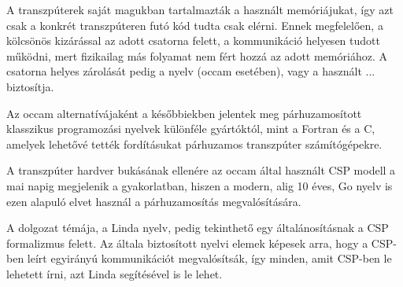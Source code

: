 A transzpúterek saját magukban tartalmazták a használt memóriájukat, így azt csak a konkrét transzpúteren futó kód tudta csak elérni.
Ennek megfelelően, a kölcsönös kizárással az adott csatorna felett, a kommunikáció helyesen tudott működni, mert fizikailag más folyamat nem fért hozzá az adott memóriához.
A csatorna helyes zárolását pedig a nyelv (occam esetében), vagy a használt ... biztosítja.

Az occam alternatívájaként a későbbiekben jelentek meg párhuzamosított klasszikus programozási nyelvek különféle gyártóktól, mint a Fortran és a C, amelyek lehetővé tették fordításukat párhuzamos transzpúter számítógépekre.

A transzpúter hardver bukásának ellenére az occam által használt CSP modell a mai napig megjelenik a gyakorlatban, hiszen a modern, alig 10 éves, Go nyelv is ezen alapuló elvet használ a párhuzamosítás megvalósítására. \cite{google_frequently_nodate}

A dolgozat témája, a Linda nyelv, pedig tekinthető egy általánosításnak a CSP formalizmus felett. %
Az általa biztosított nyelvi elemek képesek arra, hogy a CSP-ben leírt egyirányú kommunikációt megvalósítsák, így minden, amit CSP-ben le lehetett írni, azt Linda segítésével is le lehet.

%
%
%
%





